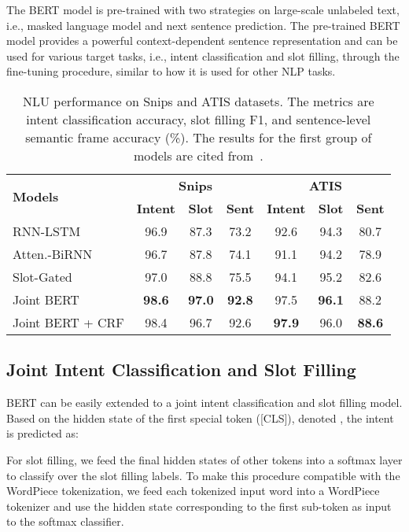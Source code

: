 \documentclass[11pt,a4paper]{article}
\begin{document}
The BERT model is pre-trained with two strategies on large-scale unlabeled text, i.e., masked language model and next sentence prediction. The pre-trained BERT model provides a powerful context-dependent sentence representation and can be used for various target tasks, i.e., intent classification and slot filling, through the fine-tuning procedure, similar to how it is used for other NLP tasks.

\begin{table*}[ht]
\begin{center}
\begin{tabular}{l c c c c c c}
\hline
\multirow{2}{*}{\textbf{Models}} & \multicolumn{3}{c}{\textbf{Snips}} & \multicolumn{3}{c}{\textbf{ATIS}}  \\
 & \textbf{Intent} & \textbf{Slot} & \textbf{Sent} & \textbf{Intent} & \textbf{Slot} & \textbf{Sent} \\
\hline
RNN-LSTM~\citep{DBLP:conf/interspeech/Hakkani-TurTCCG16} & 96.9 & 87.3 & 73.2 & 92.6 & 94.3 & 80.7 \\
Atten.-BiRNN~\citep{DBLP:conf/interspeech/LiuL16} & 96.7 & 87.8 & 74.1 & 91.1 & 94.2 & 78.9 \\
Slot-Gated~\citep{DBLP:conf/naacl/GooGHHCHC18} & 97.0 & 88.8 & 75.5 & 94.1 & 95.2 & 82.6 \\
\hline
Joint BERT & \textbf{98.6} & \textbf{97.0} & \textbf{92.8} & {97.5} & \textbf{96.1} & {88.2} \\
Joint BERT + CRF & {98.4} & {96.7} & {92.6} & \textbf{97.9} & {96.0} & \textbf{88.6}\\
\hline
\end{tabular}
\end{center}
\caption{NLU performance on Snips and ATIS datasets. The metrics are intent classification accuracy, slot filling F1, and sentence-level semantic frame accuracy (\%). The results for the first group of models are cited from~\citet{DBLP:conf/naacl/GooGHHCHC18}.}
\label{tab:result}
\end{table*}

\subsection{Joint Intent Classification and Slot Filling}
BERT can be easily extended to a joint intent classification and slot filling model. Based on the hidden state of the first special token ([CLS]), denoted ,  the intent is predicted as:

For slot filling, we feed the final hidden states of other tokens  into a softmax layer to classify over the slot filling labels. To make this procedure compatible with the WordPiece tokenization, we feed each tokenized input word into a WordPiece tokenizer and use the hidden state corresponding to the first sub-token as input to the softmax classifier. 
\end{document}
